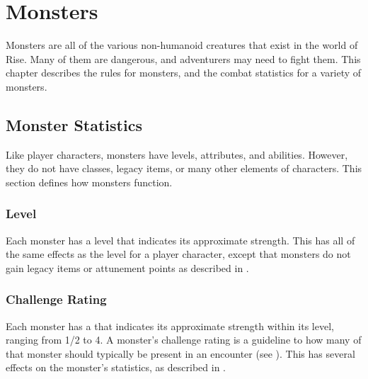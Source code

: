 \chapter{Monsters}

Monsters are all of the various non-humanoid creatures that exist in the world of Rise.
Many of them are dangerous, and adventurers may need to fight them.
This chapter describes the rules for monsters, and the combat statistics for a variety of monsters.

\section{Monster Statistics}
    Like player characters, monsters have levels, attributes, and abilities.
    However, they do not have classes, legacy items, or many other elements of characters.
    This section defines how monsters function.

    \subsection{Level}
        Each monster has a level that indicates its approximate strength.
        This has all of the same effects as the level for a player character, except that monsters do not gain legacy items or attunement points as described in .

    \subsection{Challenge Rating}\label{Challenge Rating}
        Each monster has a  that indicates its approximate strength within its level, ranging from 1/2 to 4.
        A monster's challenge rating is a guideline to how many of that monster should typically be present in an encounter (see ).
        This has several effects on the monster's statistics, as described in .

